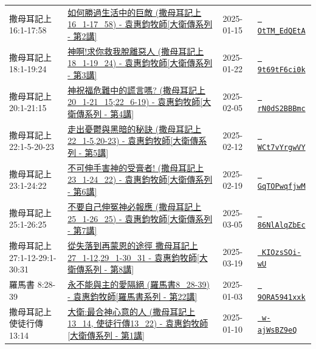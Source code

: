 \documentclass{book}
\begin{document}
{ \scriptsize


\begin{xltabular}{\textwidth}{|p{0.15\textwidth} p{0.6\textwidth}|p{0.07\textwidth} p{0.1\textwidth}|}
\hline
撒母耳記上 16:1-17:58 & \hyperref[sec:OtTM_EdQEtA]{如何勝過生活中的巨敵 (撒母耳記上16\_1-17\_58) - 袁惠鈞牧師[大衛傳系列 - 第2講]} & 2025-01-15 & \href{https://youtube.com/watch?v=OtTM_EdQEtA}{\texttt{ OtTM\_EdQEtA}} \\
撒母耳記上 18:1-19:24 & \hyperref[sec:9t69tF6ci0k]{神啊!求你救我脫離惡人 (撒母耳記上18\_1-19\_24) - 袁惠鈞牧師[大衛傳系列 - 第3講]} & 2025-01-22 & \href{https://youtube.com/watch?v=9t69tF6ci0k}{\texttt{ 9t69tF6ci0k}} \\
撒母耳記上 20:1-21:15 & \hyperref[sec:rN0dS2BBBmc]{神祝福危難中的謊言嗎?  (撒母耳記上20\_1-21\_15;22\_6-19) - 袁惠鈞牧師[大衛傳系列 - 第4講]} & 2025-02-05 & \href{https://youtube.com/watch?v=rN0dS2BBBmc}{\texttt{ rN0dS2BBBmc}} \\
撒母耳記上 22:1-5-20-23 & \hyperref[sec:WCt7vYrgwVY]{走出憂鬱與黑暗的秘訣 (撒母耳記上22\_1-5,20-23) - 袁惠鈞牧師[大衛傳系列 - 第5講]} & 2025-02-12 & \href{https://youtube.com/watch?v=WCt7vYrgwVY}{\texttt{ WCt7vYrgwVY}} \\
撒母耳記上 23:1-24:22 & \hyperref[sec:GqTOPwqfjwM]{不可伸手害神的受膏者! (撒母耳記上23\_1-24\_22) - 袁惠鈞牧師[大衛傳系列 - 第6講]} & 2025-02-19 & \href{https://youtube.com/watch?v=GqTOPwqfjwM}{\texttt{ GqTOPwqfjwM}} \\
撒母耳記上 25:1-26:25 & \hyperref[sec:86NlAlqZbEc]{不要自己伸冤神必報應 (撒母耳記上25\_1-26\_25) - 袁惠鈞牧師[大衛傳系列 - 第7講]} & 2025-03-05 & \href{https://youtube.com/watch?v=86NlAlqZbEc}{\texttt{ 86NlAlqZbEc}} \\
撒母耳記上 27:1-12-29:1-30:31 & \hyperref[sec:KIOzsSOi_wU]{從失落到再蒙恩的途徑 撒母耳記上27\_1-12,29\_1-30\_31 - 袁惠鈞牧師[大衛傳系列 - 第8講]} & 2025-03-19 & \href{https://youtube.com/watch?v=KIOzsSOi-wU}{\texttt{ KIOzsSOi-wU}} \\
羅馬書 8:28-39 & \hyperref[sec:9ORA5941xxk]{永不能與主的愛隔絕 (羅馬書8\_28-39) - 袁惠鈞牧師[羅馬書系列 - 第22講]} & 2025-01-03 & \href{https://youtube.com/watch?v=9ORA5941xxk}{\texttt{ 9ORA5941xxk}} \\
撒母耳記上使徒行傳 13:14 & \hyperref[sec:w_ajWsBZ9eQ]{大衛:最合神心意的人 (撒母耳記上13\_14, 使徒行傳13\_22) - 袁惠鈞牧師[大衛傳系列 - 第1講]} & 2025-01-10 & \href{https://youtube.com/watch?v=w-ajWsBZ9eQ}{\texttt{ w-ajWsBZ9eQ}} \\
\hline
\end{xltabular}
}
\newpage
\end{document}
